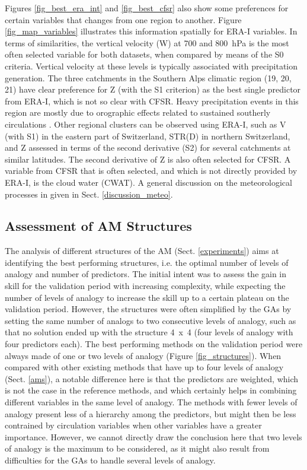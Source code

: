 \documentclass[draft]{agujournal2019}
\begin{document}
Figures \ref{fig_best_era_int} and \ref{fig_best_cfsr} also show some preferences for certain variables that changes from one region to another. Figure \ref{fig_map_variables} illustrates this information spatially for ERA-I variables. In terms of similarities, the vertical velocity (W) at 700 and 800~hPa is the most often selected variable for both datasets, when compared by means of the S0 criteria. Vertical velocity at these levels is typically associated with precipitation generation. The three catchments in the Southern Alps climatic region (19, 20, 21) have clear preference for Z (with the S1 criterion) as the best single predictor from ERA-I, which is not so clear with CFSR. Heavy precipitation events in this region are mostly due to orographic effects related to sustained southerly circulations \cite{Massacand1998}. Other regional clusters can be observed using ERA-I, such as V (with S1) in the eastern part of Switzerland, STR(D) in northern Switzerland, and Z assessed in terms of the second derivative (S2) for several catchments at similar latitudes. The second derivative of Z is also often selected for CFSR. A variable from CFSR that is often selected, and which is not directly provided by ERA-I, is the cloud water (CWAT). A general discussion on the meteorological processes in given in Sect. \ref{discussion_meteo}.


\subsection{Assessment of AM Structures}
\label{structures}

The analysis of different structures of the AM (Sect. \ref{experiments}) aims at identifying the best performing structures, i.e. the optimal number of levels of analogy and number of predictors. The initial intent was to assess the gain in skill for the validation period with increasing complexity, while expecting the number of levels of analogy to increase the skill up to a certain plateau on the validation period. However, the structures were often simplified by the GAs by setting the same number of analogs to two consecutive levels of analogy, such as that no solution ended up with the structure 4~x~4 (four levels of analogy with four predictors each). The best performing methods on the validation period were always made of one or two levels of analogy (Figure \ref{fig_structures}). When compared with other existing methods that have up to four levels of analogy (Sect. \ref{ams}), a notable difference here is that the predictors are weighted, which is not the case in the reference methods, and which certainly helps in combining different variables in the same level of analogy. The methods with fewer levels of analogy present less of a hierarchy among the predictors, but might then be less contrained by circulation variables when other variables have a greater importance. However, we cannot directly draw the conclusion here that two levels of analogy is the maximum to be considered, as it might also result from difficulties for the GAs to handle several levels of analogy.
\end{document}
